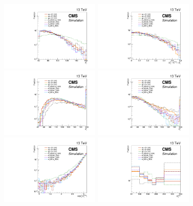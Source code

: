 \begin{figure}[htbp]
  \centering
  \includegraphics[width=0.42\textwidth]{figures/signals_ptll_presel.pdf}
  \includegraphics[width=0.42\textwidth]{figures/signals_balance_presel.pdf}
  \includegraphics[width=0.42\textwidth]{figures/signals_ptl1_fullsel.pdf}
  \includegraphics[width=0.42\textwidth]{figures/signals_ptl2_fullsel.pdf}
  \includegraphics[width=0.42\textwidth]{figures/signals_dphiZMET_nminusone.pdf}
  \includegraphics[width=0.42\textwidth]{figures/signals_met.pdf}

\end{figure}
